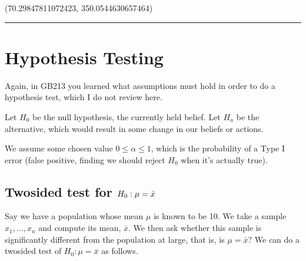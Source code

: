 \documentclass[letterpaper,10pt,english]{jupyterBook}
\begin{document}
\begin{sphinxVerbatim}[commandchars=\\\{\}]
(70.29847811072423, 350.0544630657464)
\end{sphinxVerbatim}


\bigskip\hrule\bigskip



\section{Hypothesis Testing}
\label{\detokenize{GB213-review-in-Python:hypothesis-testing}}
\sphinxAtStartPar
Again, in GB213 you learned what assumptions must hold in order to do a hypothesis test, which I do not review here.

\sphinxAtStartPar
Let \(H_0\) be the null hypothesis, the currently held belief.  Let \(H_a\) be the alternative, which would result in some change in our beliefs or actions.

\sphinxAtStartPar
We assume some chosen value \(0\leq\alpha\leq1\), which is the probability of a Type I error (false positive, finding we should reject \(H_0\) when it’s actually true).


\subsection{Two\sphinxhyphen{}sided test for \protect\(H_0:\mu=\bar{x}\protect\)}
\label{\detokenize{GB213-review-in-Python:two-sided-test-for-h-0-mu-bar-x}}
\sphinxAtStartPar
Say we have a population whose mean \(\mu\) is known to be 10.  We take a sample \(x_1,\ldots,x_n\) and compute its mean, \(\bar{x}\).  We then ask whether this sample is significantly different from the population at large, that is, is \(\mu=\bar{x}\)?  We can do a two\sphinxhyphen{}sided test of \(H_0:\mu=\bar{x}\) as follows.

\begin{sphinxVerbatim}[commandchars=\\\{\}]
  
  
  \PYG{p}{[}      \PYG{p}{]}
      
    
  
\end{sphinxVerbatim}
\end{document}
